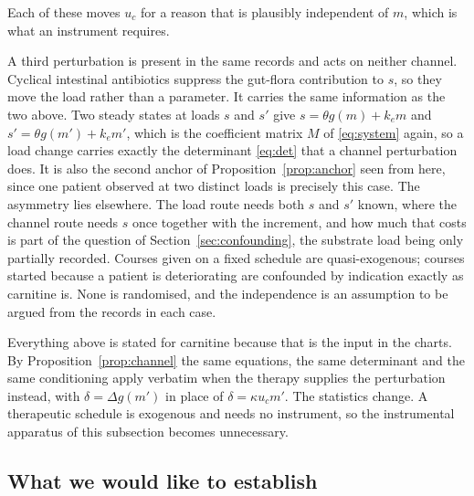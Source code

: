 Each of these moves $u_c$ for a reason that is plausibly independent of $m$, which is what
an instrument requires.

A third perturbation is present in the same records and acts on neither channel. Cyclical
intestinal antibiotics suppress the gut-flora contribution to $s$, so they move the load
rather than a parameter. It carries the same information as the two above. Two steady
states at loads $s$ and $s'$ give $s = \theta g(m) + k_e m$ and
$s' = \theta g(m') + k_e m'$, which is the coefficient matrix $M$ of \eqref{eq:system}
again, so a load change carries exactly the determinant \eqref{eq:det} that a channel
perturbation does. It is also the second anchor of Proposition~\ref{prop:anchor} seen from
here, since one patient observed at two distinct loads is precisely this case.
The asymmetry lies elsewhere. The load route needs both $s$ and $s'$ known, where the
channel route needs $s$ once together with the increment, and how much that costs is part
of the question of Section~\ref{sec:confounding}, the substrate load being only partially
recorded. Courses given on a fixed schedule are quasi-exogenous;
courses started because a patient is deteriorating are confounded by indication exactly as
carnitine is. None is randomised, and the independence is an assumption to be
argued from the records in each case.

\begin{remark}
Everything above is stated for carnitine because that is the input in the charts. By
Proposition~\ref{prop:channel} the same equations, the same determinant and the same
conditioning apply verbatim when the therapy supplies the perturbation instead, with
$\delta = \Delta g(m')$ in place of $\delta = \kappa u_c m'$. The statistics change. A
therapeutic schedule is exogenous and needs no instrument, so the instrumental apparatus of
this subsection becomes unnecessary.
\end{remark}

\subsection{What we would like to establish}

